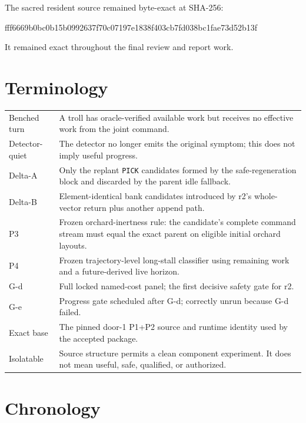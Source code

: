 \documentclass[10pt,a4paper]{article}
\newcommand{\code}[1]{\texttt{#1}}
\begin{document}
The sacred resident source remained byte-exact at SHA-256:

\begin{center}
{\footnotesize\ttfamily fff6669b0bc0b15b0992637f70c07197e1838f403cb7fd038bc1fae73d52b13f}
\end{center}

It remained exact throughout the final review and report work.

\section{Terminology}

\begin{tabularx}{\textwidth}{@{}p{34mm}Y@{}}
\toprule
Benched turn & A troll has oracle-verified available work but receives no effective work from the joint command. \\
Detector-quiet & The detector no longer emits the original symptom; this does not imply useful progress. \\
Delta-A & Only the replant \code{PICK} candidates formed by the safe-regeneration block and discarded by the parent idle fallback. \\
Delta-B & Element-identical bank candidates introduced by r2's whole-vector return plus another append path. \\
P3 & Frozen orchard-inertness rule: the candidate's complete command stream must equal the exact parent on eligible initial orchard layouts. \\
P4 & Frozen trajectory-level long-stall classifier using remaining work and a future-derived live horizon. \\
G-d & Full locked named-cost panel; the first decisive safety gate for r2. \\
G-e & Progress gate scheduled after G-d; correctly unrun because G-d failed. \\
Exact base & The pinned door-1 P1+P2 source and runtime identity used by the accepted package. \\
Isolatable & Source structure permits a clean component experiment. It does not mean useful, safe, qualified, or authorized. \\
\bottomrule
\end{tabularx}

\section{Chronology}
\end{document}
